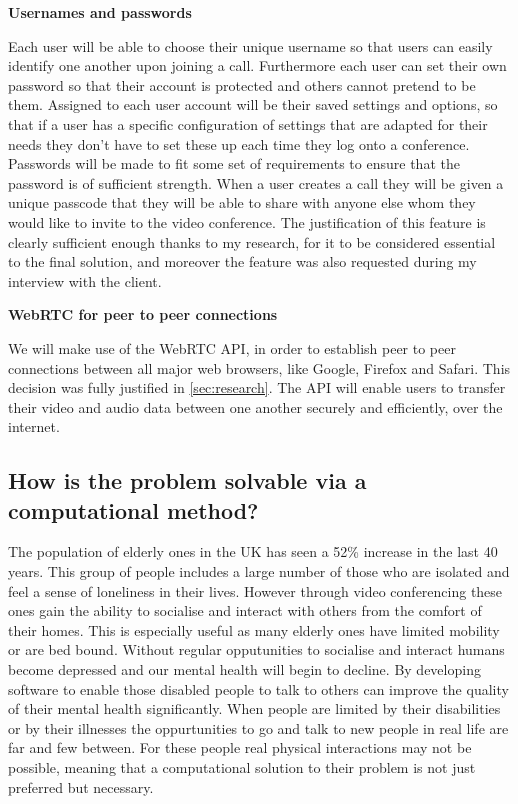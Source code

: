 \vspace{0.2cm}

\textbf{Usernames and passwords} \\ \vspace{0.1cm}

Each user will be able to choose their unique username so 
that users can easily identify one another upon joining a call.
Furthermore each user can set their own password so that their
account is protected and others cannot pretend to be them. 
Assigned to each user account will be their saved settings and
options, so that if a user has a specific configuration of 
settings that are adapted for their needs they don't have to 
set these up each time they log onto a conference. Passwords 
will be made to fit some set of requirements to ensure that 
the password is of sufficient strength. When a user creates a 
call they will be given a unique passcode that they will be 
able to share with anyone else whom they would like to invite
to the video conference. The justification of this feature is
clearly sufficient enough thanks to my research, for it to be
considered essential to the final solution, and moreover the
feature was also requested during my interview with the client.

\vspace{0.2cm}

\textbf{WebRTC for peer to peer connections} \\ \vspace{0.1cm}

We will make use of the WebRTC API, in order to establish peer 
to peer connections between all major web browsers, like
Google, Firefox and Safari. This decision was fully justified 
in \ref{sec:research}. The API will enable users to transfer
their video and audio data between one another securely and
efficiently, over the internet.

\subsection{How is the problem solvable via a computational
method?}

The population of elderly ones in the UK has seen a 52\% 
increase in the last 40 years. This group of people includes
a large number of those who are isolated and feel a sense of 
loneliness in their lives. However through video conferencing
these ones gain the ability to socialise and interact with 
others from the comfort of their homes. This is especially 
useful as many elderly ones have limited mobility or are bed 
bound. Without regular opputunities to socialise and interact 
humans become depressed and our mental health will begin to 
decline. By developing software to enable those disabled 
people to talk to others can improve the quality of their 
mental health significantly. When people are limited by their 
disabilities or by their illnesses the oppurtunities to go and
talk to new people in real life are far and few between. For
these people real physical interactions may not be possible,
meaning that a computational solution to their problem is not
just preferred but necessary. \vspace{0.2cm}

